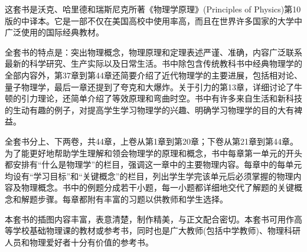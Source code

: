 
    这套书是沃克、哈里德和瑞斯尼克所著《物理学原理》(Principles of Physics)第10版的中译本。它是一部不仅在美国高校中使用率高，而且在世界许多国家的大学中广泛使用的国际经典教材。
    
    全套书的特点是：突出物理概念，物理原理和定理表述严谨、准确，内容广泛联系最新的科学研究、生产实际以及日常生活。书中除包含传统教科书中经典物理学的全部内容外，第37章到第44章还简要介绍了近代物理学的主要进展，包括相对论、量子物理学，最后一章还提到了夸克和大爆炸。关于引力的第13章，详细讨论了牛顿的引力理论，还简单介绍了等效原理和弯曲时空。书中有许多来自生活和新科技的生动有趣的例子，对提高学生学习物理学的兴趣、明确学习物理学的目的大有裨益。
    
    全套书分上、下两卷，共44章，上卷从第1章到第20章；下卷从第21章到第44章。为了能更好地帮助学生理解和领会物理学的原理和概念，书中每章第一单元的开头都安排有“什么是物理学”的栏目，强调这一章中的主要物理内容。每章中的每单元均设有“学习目标”和“关键概念”的栏目，列出学生学完该单元后必须掌握的物理内容及物理概念。书中的例题分成若干小题，每一小题都详细地交代了解题的关键概念和解题步骤。每章都附有丰富的习题以供教师和学生选择。
    
    本套书的插图内容丰富，表意清楚，制作精美，与正文配合密切。本套书可用作高等学校基础物理课的教材或参考书，同时也是广大教师(包括中学教师)、物理科研人员和物理爱好者十分有价值的参考书。
    